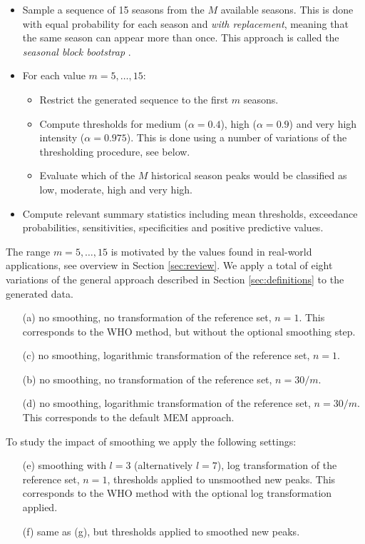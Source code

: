 \documentclass{article}
\begin{document}
\begin{itemize}
\item Sample a sequence of 15 seasons from the $M$ available seasons. This is done with equal probability for each season and \textit{with replacement}, meaning that the same season can appear more than once. This approach is called the \textit{seasonal block bootstrap} \citep{Politis2001}.
\item For each value $m = 5, \dots, 15$:
\begin{itemize}
\item Restrict the generated sequence to the first $m$ seasons.
\item Compute thresholds for medium ($\alpha = 0.4$), high ($\alpha = 0.9$) and very high intensity ($\alpha = 0.975$). This is done using a number of variations of the thresholding procedure, see below.
\item Evaluate which of the $M$ historical season peaks would be classified as low, moderate, high and very high.
\end{itemize}
\item Compute relevant summary statistics including mean thresholds, exceedance probabilities, sensitivities, specificities and positive predictive values.
\end{itemize}
The range $m =5, \dots, 15$ is motivated by the values found in real-world applications, see overview in Section \ref{sec:review}. We apply a total of eight variations of the general approach described in Section \ref{sec:definitions} to the generated data.
\begin{enumerate}
\item[(a)] no smoothing, no transformation of the reference set, $n = 1$. This corresponds to the WHO method, but without the optional smoothing step.
\item[(c)] no smoothing, logarithmic transformation of the reference set, $n = 1$.
\item[(b)] no smoothing, no transformation of the reference set, $n = 30/m$.
\item[(d)] no smoothing, logarithmic transformation of the reference set, $n = 30/m$. This corresponds to the default MEM approach.
\end{enumerate}
\noindent To study the impact of smoothing we apply the following settings:
\begin{enumerate}
\item[(e)] smoothing with $l = 3$ (alternatively $l = 7$), log transformation of the reference set, $n = 1$, thresholds applied to unsmoothed new peaks. This corresponds to the WHO method with the optional log transformation applied.
\item[(f)] same as (g), but thresholds applied to smoothed new peaks.
\end{enumerate}
\end{document}
